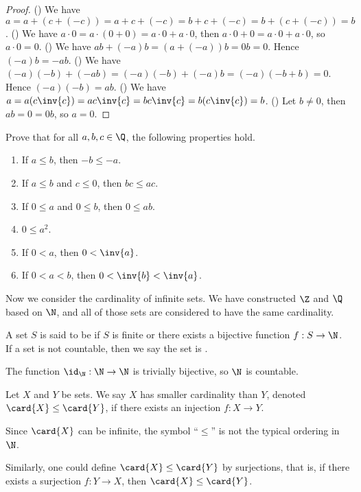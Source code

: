 \documentclass[10pt]{article}
\begin{document}
\begin{proof}
    () We have $a=a+(c+(-c))=a+c+(-c)=b+c+(-c)=b+(c+(-c))=b$. () We have $a\cdot 0=a\cdot(0+0)=a\cdot 0+a\cdot 0$, then $a\cdot 0+0=a\cdot 0+a\cdot 0$, so $a\cdot 0=0$. () We have $ab+(-a)b=(a+(-a))b=0b=0$. Hence $(-a)b=-ab$. () We have $(-a)(-b)+(-ab)=(-a)(-b)+(-a)b=(-a)(-b+b)=0$. Hence $(-a)(-b)=ab$. () We have $a=a(c\inv{c})=ac\inv{c}=bc\inv{c}=b(c\inv{c})=b$. () Let $b\ne 0$, then $ab=0=0b$, so $a=0$. 
\end{proof}
\begin{problem}
    Prove that for all $a,b,c\in\Q$, the following properties hold.
    \begin{enumerate}
        \item If $a\le b$, then $-b\le -a$.
        \item If $a\le b$ and $c\le 0$, then $bc\le ac$.
        \item If $0\le a$ and $0\le b$, then $0\le ab$.
        \item $0\le{a}^{2}$.
        \item If $0<a$, then $0<\inv{a}$.
        \item If $0<a<b$, then $0<\inv{b}<\inv{a}$.
    \end{enumerate}
\end{problem}
\par
Now we consider the cardinality of infinite sets. We have constructed $\Z$ and $\Q$ based on $\N$, and all of those sets are considered to have the same cardinality.
\begin{definition}
    A set $S$ is said to be  if $S$ is finite or there exists a bijective function $f:S\to\N$. If a set is not countable, then we say the set is .
\end{definition}
\par
The function ${\id}_{\N}:\N\to\N$ is trivially bijective, so $\N$ is countable.
\begin{definition}
    Let $X$ and $Y$ be sets. We say $X$ has smaller cardinality than $Y$, denoted $\card{X}\le\card{Y}$, if there exists an injection $f:X\to Y$.
\end{definition}
\begin{remark}
    Since $\card{X}$ can be infinite, the symbol ``$\le$'' is not the typical ordering in $\N$.
\end{remark}
\par
Similarly, one could define $\card{X}\le\card{Y}$ by surjections, that is, if there exists a surjection $f:Y\to X$, then $\card{X}\le\card{Y}$.
\end{document}
